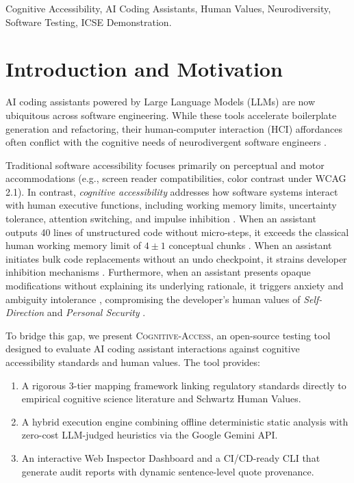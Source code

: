 \documentclass[conference]{IEEEtran}
\begin{document}
\begin{IEEEkeywords}
Cognitive Accessibility, AI Coding Assistants, Human Values, Neurodiversity, Software Testing, ICSE Demonstration.
\end{IEEEkeywords}

\section{Introduction and Motivation}
AI coding assistants powered by Large Language Models (LLMs) are now ubiquitous across software engineering. While these tools accelerate boilerplate generation and refactoring, their human-computer interaction (HCI) affordances often conflict with the cognitive needs of neurodivergent software engineers \cite{barkley1997, carleton2006, cowan2001}.

Traditional software accessibility focuses primarily on perceptual and motor accommodations (e.g., screen reader compatibilities, color contrast under WCAG 2.1). In contrast, \textit{cognitive accessibility} addresses how software systems interact with human executive functions, including working memory limits, uncertainty tolerance, attention switching, and impulse inhibition \cite{perera2019, steel2007}. When an assistant outputs 40 lines of unstructured code without micro-steps, it exceeds the classical human working memory limit of $4 \pm 1$ conceptual chunks \cite{cowan2001}. When an assistant initiates bulk code replacements without an undo checkpoint, it strains developer inhibition mechanisms \cite{barkley1997}. Furthermore, when an assistant presents opaque modifications without explaining its underlying rationale, it triggers anxiety and ambiguity intolerance \cite{carleton2006}, compromising the developer's human values of \textit{Self-Direction} and \textit{Personal Security} \cite{schwartz2012, perera2019}.

To bridge this gap, we present \textsc{Cognitive-Access}, an open-source testing tool designed to evaluate AI coding assistant interactions against cognitive accessibility standards and human values. The tool provides:
\begin{enumerate}
    \item A rigorous 3-tier mapping framework linking regulatory standards directly to empirical cognitive science literature and Schwartz Human Values.
    \item A hybrid execution engine combining offline deterministic static analysis with zero-cost LLM-judged heuristics via the Google Gemini API.
    \item An interactive Web Inspector Dashboard and a CI/CD-ready CLI that generate audit reports with dynamic sentence-level quote provenance.
\end{enumerate}
\end{document}
